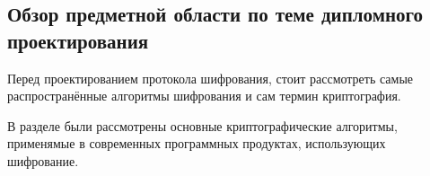 \subsection{Обзор предметной области по теме дипломного проектирования}
\label{sec:analysis:research:crypto}

Перед проектированием протокола шифрования, стоит рассмотреть самые распространённые алгоритмы шифрования и сам термин криптография.





В разделе были рассмотрены основные криптографические алгоритмы, применямые в современных программных продуктах, использующих шифрование.